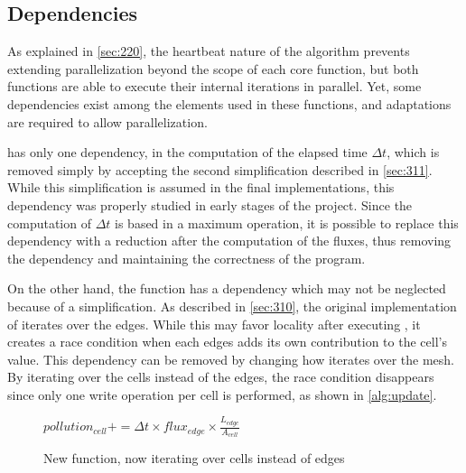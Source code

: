\subsection{Dependencies}
\label{sec:dependencies}



As explained in \cref{sec:220}, the heartbeat nature of the algorithm prevents extending parallelization beyond the scope of each core function, but both functions are able to execute their internal iterations in parallel.
Yet, some dependencies exist among the elements used in these functions, and adaptations are required to allow parallelization.

\computeflux has only one dependency, in the computation of the elapsed time $\Delta t$, which is removed simply by accepting the second simplification described in \cref{sec:311}.
While this simplification is assumed in the final implementations, this dependency was properly studied in early stages of the project.
Since the computation of $\Delta t$ is based in a maximum operation, it is possible to replace this dependency with a reduction after the computation of the fluxes, thus removing the dependency and maintaining the correctness of the program.

On the other hand, the \update function has a dependency which may not be neglected because of a simplification.
As described in \cref{sec:310}, the original implementation of \update iterates over the edges.
While this may favor locality after executing \computeflux, it creates a race condition when each edges adds its own contribution to the cell's value.
This dependency can be removed by changing how \update iterates over the mesh. By iterating over the cells instead of the edges, the race condition disappears since only one write operation per cell is performed, as shown in \cref{alg:update}.

\begin{figure}[!htp]
	\begin{alg}
				\State $pollution_{cell} += \Delta{t} \times flux_{edge} \times \frac{L_{edge}}{A_{cell}}$
			\EndFor
		\EndFor
	\end{alg}

	\caption{New \update function, now iterating over cells instead of edges}
	\label{alg:update2}
\end{figure}
